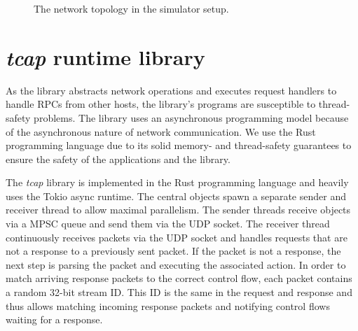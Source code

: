 \begin{figure}[H]
  \centering
  \resizebox{\textwidth}{!}{
    
    }
  \caption{\label{fig:dev-setup} The network topology in the simulator setup.}
\end{figure}


\section{\emph{tcap} runtime library}
As the library abstracts network operations and executes request handlers to handle \acp{RPC} from other hosts, the library's programs are susceptible to thread-safety problems. The library uses an asynchronous programming model because of the asynchronous nature of network communication. We use the Rust programming language due to its solid memory- and thread-safety guarantees to ensure the safety of the applications and the library.

The \emph{tcap} library is implemented in the Rust programming language and heavily uses the Tokio async runtime. The central  objects spawn a separate sender and receiver thread to allow maximal parallelism. The sender threads receive  objects via a \ac{MPSC} queue and send them via the \ac{UDP} socket. The receiver thread continuously receives packets via the \ac{UDP} socket and handles requests that are not a response to a previously sent packet. If the packet is not a response, the next step is parsing the packet and executing the associated action. In order to match arriving response packets to the correct control flow, each packet contains a random 32-bit stream ID. This ID is the same in the request and response and thus allows matching incoming response packets and notifying control flows waiting for a response.

